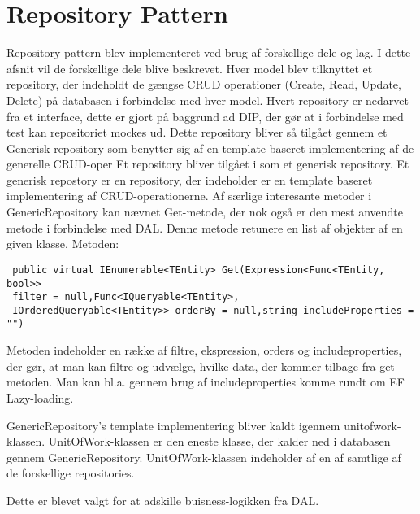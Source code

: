 \section{Repository Pattern}
Repository pattern blev implementeret ved brug af forskellige dele og lag. I dette afsnit vil de forskellige dele blive beskrevet.
Hver  model blev tilknyttet et repository, der indeholdt de gængse CRUD operationer (Create, Read, Update, Delete) på databasen i forbindelse med hver model. 
Hvert repository er nedarvet fra et interface, dette er gjort på baggrund ad DIP, der gør at i forbindelse med test kan repositoriet mockes ud.
Dette repository bliver så tilgået gennem et Generisk repository som benytter sig af en template-baseret implementering af de generelle CRUD-oper
Et repository bliver tilgået i som et generisk repository. Et generisk repostory er en repository, der indeholder er en template baseret implementering af CRUD-operationerne. 
Af særlige interesante metoder i GenericRepository kan nævnet Get-metode, der nok også er den mest anvendte metode i forbindelse med DAL. Denne metode retunere en list af objekter af en given klasse.
Metoden:
\begin{verbatim}
 public virtual IEnumerable<TEntity> Get(Expression<Func<TEntity, bool>> 
 filter = null,Func<IQueryable<TEntity>, 
 IOrderedQueryable<TEntity>> orderBy = null,string includeProperties = "")
\end{verbatim}
Metoden indeholder en række af filtre, ekspression, orders og includeproperties, der gør, at man kan filtre og udvælge, hvilke data, der kommer tilbage fra get-metoden. Man kan bl.a. gennem brug af includeproperties komme rundt om EF Lazy-loading. 

GenericRepository's template implementering bliver kaldt igennem unitofwork-klassen. UnitOfWork-klassen er den eneste klasse, der kalder ned i databasen gennem GenericRepository. UnitOfWork-klassen indeholder af en af samtlige af de forskellige repositories. 

Dette er blevet valgt for at adskille buisness-logikken fra DAL.
